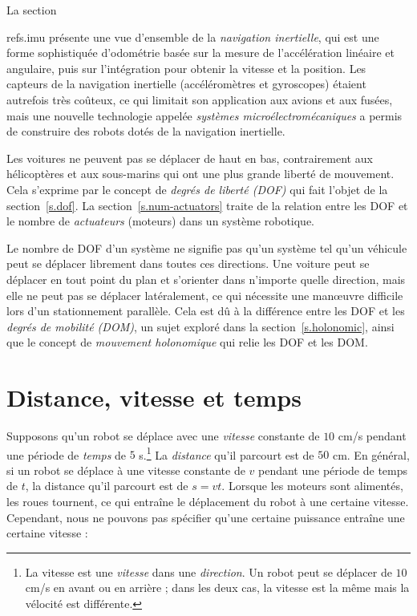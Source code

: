 La section~{ref{s.imu} présente une vue d'ensemble de la \emph{navigation inertielle}, qui est une forme sophistiquée d'odométrie basée sur la mesure de l'accélération linéaire et angulaire, puis sur l'intégration pour obtenir la vitesse et la position. Les capteurs de la navigation inertielle (accéléromètres et gyroscopes) étaient autrefois très coûteux, ce qui limitait son application aux avions et aux fusées, mais une nouvelle technologie appelée \emph{systèmes microélectromécaniques} a permis de construire des robots dotés de la navigation inertielle.

Les voitures ne peuvent pas se déplacer de haut en bas, contrairement aux hélicoptères et aux sous-marins qui ont une plus grande liberté de mouvement. Cela s'exprime par le concept de \emph{degrés de liberté (DOF)} qui fait l'objet de la section~\ref{s.dof}. La section~\ref{s.num-actuators} traite de la relation entre les DOF et le nombre de \emph{actuateurs} (moteurs) dans un système robotique.

Le nombre de DOF d'un système ne signifie pas qu'un système tel qu'un véhicule peut se déplacer librement dans toutes ces directions. Une voiture peut se déplacer en tout point du plan et s'orienter dans n'importe quelle direction, mais elle ne peut pas se déplacer latéralement, ce qui nécessite une manœuvre difficile lors d'un stationnement parallèle. Cela est dû à la différence entre les DOF et les \emph{degrés de mobilité (DOM)}, un sujet exploré dans la section~\ref{s.holonomic}, ainsi que le concept de \emph{mouvement holonomique} qui relie les DOF et les DOM.



\section{Distance, vitesse et temps}\label{s.distance-vitesse}

Supposons qu'un robot se déplace avec une \emph{vitesse} constante de $10$ cm/s pendant une période de \emph{temps} de $5$ s.\footnote{La vitesse est une \emph{vitesse} dans une \emph{direction}. Un robot peut se déplacer de $10$ cm/s en avant ou en arrière ; dans les deux cas, la vitesse est la même mais la vélocité est différente.} La \emph{distance} qu'il parcourt est de $50$ cm. En général, si un robot se déplace à une vitesse constante de $v$ pendant une période de temps de $t$, la distance qu'il parcourt est de $s=vt$. Lorsque les moteurs sont alimentés, les roues tournent, ce qui entraîne le déplacement du robot à une certaine vitesse. Cependant, nous ne pouvons pas spécifier qu'une certaine puissance entraîne une certaine vitesse :

}
